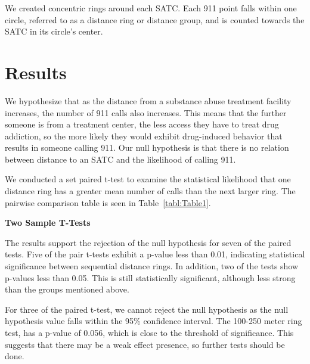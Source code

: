 \documentclass[12pt]{article}
\begin{document}
We created concentric rings around each SATC. Each 911 point falls within one circle, referred to as a distance ring or distance group, and is counted towards the SATC in its circle's center.


\section{Results}
\label{sec:result}

We hypothesize that as the distance from a substance abuse treatment facility increases, the number of 911 calls also increases. This means that the further someone is from a treatment center, the less access they have to treat drug addiction, so the more likely they would exhibit drug-induced behavior that results in someone calling 911. Our null hypothesis is that there is no relation between distance to an SATC and the likelihood of calling 911. 

We conducted a set paired t-test to examine the statistical likelihood that one distance ring has a greater mean number of calls than the next larger ring. The pairwise comparison table is seen in Table~\ref{tabl:Table1}.

\begin{table}[h]
\scriptsize
\begin{center}

\end{center}
\flushleft
\caption{\textbf{Two Sample T-Tests}}
\label{tab:Table1}
\end{table}

The results support the rejection of the null hypothesis for seven of the paired tests. Five of the pair t-tests exhibit a p-value less than 0.01, indicating statistical significance between sequential distance rings. In addition, two of the tests show p-values less than 0.05. This is still statistically significant, although less strong than the groups mentioned above. 

For three of the paired t-test, we cannot reject the null hypothesis as the null hypothesis value falls within the 95\% confidence interval. The 100-250 meter ring test, has a p-value of 0.056, which is close to the threshold of significance. This suggests that there may be a weak effect presence, so further tests should be done.
\end{document}
